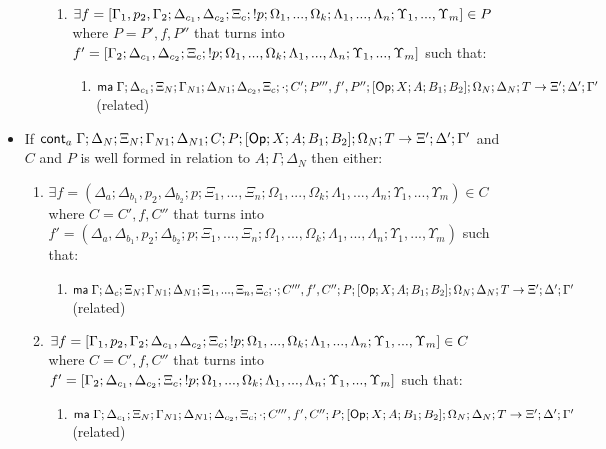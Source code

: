 \begin{theorem}
\begin{itemize}
\begin{enumerate}
\begin{enumerate}
            \item $\exists f = [\Gamma_1, p_2, \Gamma_2; \Delta_{c_1}, \Delta_{c_2}; \Xi_c; {!} p; \Omega_1, ..., \Omega_k; \Lambda_1, ..., \Lambda_n; \Upsilon_1, ..., \Upsilon_m] \in P$ where $P = P', f, P''$ that turns into $f' = [\Gamma_2; \Delta_{c_1}, \Delta_{c_2}; \Xi_c; {!} p; \Omega_1, ..., \Omega_k; \Lambda_1, ..., \Lambda_n; \Upsilon_1, ..., \Upsilon_m]$ such that:
                  \begin{enumerate}
                     \item $\mathsf{ma} \; \Gamma; \Delta_{c_1}; \Xi_N; \Gamma_{N1}; \Delta_{N1}; \Delta_{c_2}, \Xi_c; \cdot; C'; P''', f', P''; [\mathsf{Op} ; X ; A ; B_1; B_2]; \Omega_N; \Delta_N; T \rightarrow \Xi'; \Delta'; \Gamma'$ (related)
                  \end{enumerate}
         \end{enumerate}
      \end{enumerate}
      
   \item If $\mathsf{cont}_a \; \Gamma; \Delta_{N}; \Xi_{N}; \Gamma_{N1}; \Delta_{N1}; C; P; [\mathsf{Op} ; X ; A ; B_1; B_2]; \Omega_N; T \rightarrow \Xi'; \Delta'; \Gamma'$ and $C$ and $P$ is well formed in relation to $A; \Gamma; \Delta_N$ then either:
   
   \begin{enumerate}
      \item $\exists f = (\Delta_a; \Delta_{b_1}, p_2, \Delta_{b_2}; p; \Xi_1, ..., \Xi_n; \Omega_1, ..., \Omega_k; \Lambda_1, ..., \Lambda_n; \Upsilon_1, ..., \Upsilon_m) \in C$ where $C = C', f, C''$ that turns into $f' = (\Delta_a, \Delta_{b_1}, p_2; \Delta_{b_2}; p; \Xi_1, ..., \Xi_n; \Omega_1, ..., \Omega_k; \Lambda_1, ..., \Lambda_n; \Upsilon_1, ..., \Upsilon_m)$ such that:
         \begin{enumerate}
            \item $\mathsf{ma} \; \Gamma; \Delta_c; \Xi_N; \Gamma_{N1}; \Delta_{N1}; \Xi_1, ..., \Xi_n, \Xi_c; \cdot; C''', f', C''; P; [\mathsf{Op} ; X ; A ; B_1; B_2]; \Omega_N; \Delta_N; T \rightarrow \Xi'; \Delta'; \Gamma'$ (related)
         \end{enumerate}
         
      \item $\exists f = [\Gamma_1, p_2, \Gamma_2; \Delta_{c_1}, \Delta_{c_2}; \Xi_c; {!} p; \Omega_1, ..., \Omega_k; \Lambda_1, ..., \Lambda_n; \Upsilon_1, ..., \Upsilon_m] \in C$ where $C = C', f, C''$ that turns into $f' = [\Gamma_2; \Delta_{c_1}, \Delta_{c_2}; \Xi_c; {!} p; \Omega_1, ..., \Omega_k; \Lambda_1, ..., \Lambda_n; \Upsilon_1, ..., \Upsilon_m]$ such that:
         \begin{enumerate}
            \item $\mathsf{ma} \; \Gamma; \Delta_{c_1}; \Xi_N; \Gamma_{N1}; \Delta_{N1}; \Delta_{c_2}, \Xi_c; \cdot; C''', f', C''; P; [\mathsf{Op} ; X ; A ; B_1; B_2]; \Omega_N; \Delta_N; T \rightarrow \Xi'; \Delta'; \Gamma'$ (related)
         \end{enumerate}
         

\end{enumerate}
\end{itemize}
\end{theorem}
